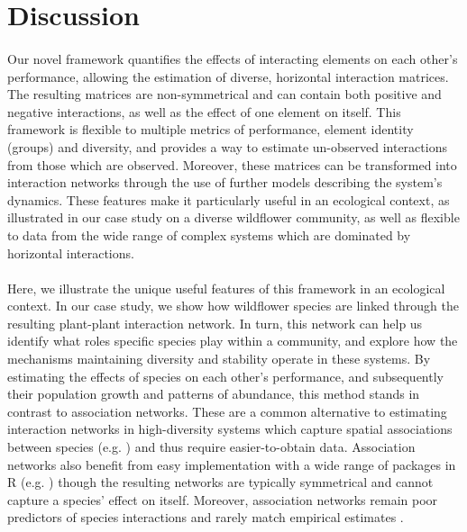 \documentclass[a4,12pt]{article}
\begin{document}
\section{Discussion}
    



    \paragraph{} 
    Our novel framework quantifies the effects of interacting elements on each other's performance, allowing the estimation of diverse, horizontal interaction matrices. The resulting matrices are non-symmetrical and can contain both positive and negative interactions, as well as the effect of one element on itself. This framework is flexible to multiple metrics of performance, element identity (groups) and diversity, and provides a way to estimate un-observed interactions from those which are observed. Moreover, these matrices can be transformed into interaction networks through the use of further models describing the system's dynamics. These features make it particularly useful in an ecological context, as illustrated in our case study on a diverse wildflower community, as well as flexible to data from the wide range of complex systems which are dominated by horizontal interactions.

    \paragraph{}
    Here, we illustrate the unique useful features of this framework in an ecological context. In our case study, we show how wildflower species are linked through the resulting plant-plant interaction network. In turn, this network can help us identify what roles specific species play within a community, and explore how the mechanisms maintaining diversity and stability operate in these systems. By estimating the effects of species on each other's performance, and subsequently their population growth and patterns of abundance, this method stands in contrast to association networks. These are a common alternative to estimating interaction networks in high-diversity systems which capture spatial associations between species (e.g. \cite{Saiz2011}) and thus require easier-to-obtain data. Association networks also benefit from easy implementation with a wide range of packages in R (e.g. \cite{Griffith2016}) though the resulting networks are typically symmetrical and cannot capture a species' effect on itself. Moreover, association networks remain poor predictors of species interactions and rarely match empirical estimates \parencite{Sander2017,Barner2018, Thurman2019, Blanchet2020}.
\end{document}
